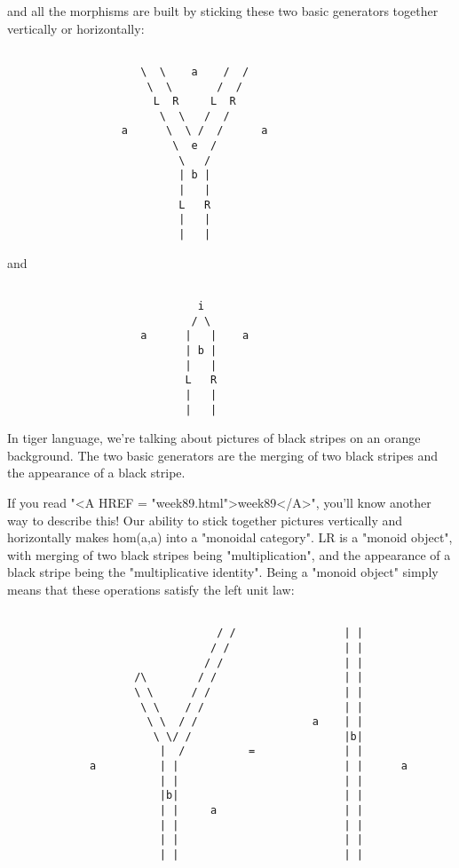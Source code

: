 and all the morphisms are built by sticking these two basic
generators together vertically or horizontally:


\begin{verbatim}

                     \  \    a    /  /  
                      \  \       /  /
                       L  R     L  R
                        \  \   /  /
                  a      \  \ /  /      a
                          \  e  /
                           \   /
                           | b |
                           |   |
                           L   R
                           |   |
                           |   |   
\end{verbatim}
    
and

\begin{verbatim}

                              i
                             / \
                     a      |   |    a
                            | b |     
                            |   |
                            L   R   
                            |   |
                            |   |
\end{verbatim}
    
In tiger language, we're talking about pictures of black stripes on an
orange background.  The two basic generators are the merging of two
black stripes and the appearance of a black stripe.  

If you read "<A HREF = "week89.html">week89</A>", you'll know
another way to describe this!  Our ability to stick together pictures
vertically and horizontally makes hom(a,a) into a "monoidal
category".  LR is a "monoid object", with merging of two
black stripes being "multiplication", and the appearance of a
black stripe being the "multiplicative identity".  Being a
"monoid object" simply means that these operations satisfy the
left unit law:



\begin{verbatim}

                                 / /                 | |
                                / /                  | |
                               / /                   | |
                    /\        / /                    | |
                    \ \      / /                     | |
                     \ \    / /                      | |
                      \ \  / /                  a    | |
                       \ \/ /                        |b|
                        |  /          =              | |
             a          | |                          | |      a
                        | |                          | |
                        |b|                          | |
                        | |     a                    | |
                        | |                          | |
                        | |                          | |
                        | |                          | |
\end{verbatim}
    
